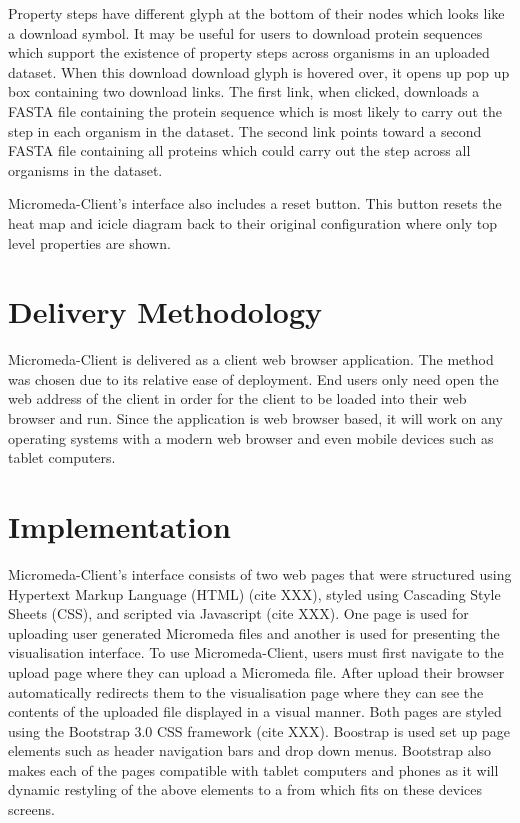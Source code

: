 Property steps have different glyph at the bottom of their nodes which looks like a download symbol. It may be useful for users to download protein sequences which support the existence of property steps across organisms in an uploaded dataset. When this download download glyph is hovered over, it opens up pop up box containing two download links. The first link, when clicked, downloads a FASTA file containing the protein sequence which is most likely to carry out the step in each organism in the dataset. The second link points toward a second FASTA file containing all proteins which could carry out the step across all organisms in the dataset.

Micromeda-Client's interface also includes a reset button. This button resets the heat map and icicle diagram back to their original configuration where only top level properties are shown.

\section{Delivery Methodology}

Micromeda-Client is delivered as a client web browser application. The method was chosen due to its relative ease of deployment. End users only need open the web address of the client in order for the client to be loaded into their web browser and run. Since the application is web browser based, it will work on any operating systems with a modern web browser and even mobile devices such as tablet computers.

\section{Implementation}

Micromeda-Client's interface consists of two web pages that were structured using Hypertext Markup Language (HTML) (cite XXX), styled using Cascading Style Sheets (CSS), and scripted via Javascript (cite XXX). One page is used for uploading user generated Micromeda files and another is used for presenting the visualisation interface. To use Micromeda-Client, users must first navigate to the upload page where they can upload a Micromeda file. After upload their browser automatically redirects them to the visualisation page where they can see the contents of the uploaded file displayed in a visual manner. Both pages are styled using the Bootstrap 3.0 CSS framework (cite XXX). Boostrap is used set up page elements such as header navigation bars and drop down menus. Bootstrap also makes each of the pages compatible with tablet computers and phones as it will dynamic restyling of the above elements to a from which fits on these devices screens.

